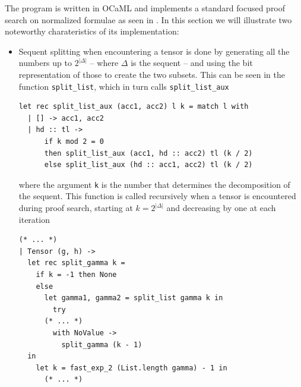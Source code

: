 \documentclass[a4paper, 12pt, tesi, english]{report}
\begin{document}
The program is written in OCaML and implements a standard focused proof search on normalized formulae as seen in \cite{LiangMiller}.
In this section we will illustrate two noteworthy charateristics of its implementation:
\begin{itemize}
	\item Sequent splitting when encountering a tensor is done by generating all the numbers up to $2^{|\Delta|}$ -- where $\Delta$ is the sequent -- and using the bit representation of those to create the two subsets.
		This can be seen in the function \texttt{split\_list}, which in turn calls \texttt{split\_list\_aux}
		\begin{lstlisting}[language=caml]
let rec split_list_aux (acc1, acc2) l k = match l with
  | [] -> acc1, acc2
  | hd :: tl -> 
      if k mod 2 = 0 
      then split_list_aux (acc1, hd :: acc2) tl (k / 2)
      else split_list_aux (hd :: acc1, acc2) tl (k / 2)
		\end{lstlisting}
		where the argument \texttt{k} is the number that determines the decomposition of the sequent.
		This function is called recursively when a tensor is encountered during proof search, starting at $ k = 2^{|\Delta|}$ and decreasing by one at each iteration
		\begin{lstlisting}[language=caml]
(* ... *)
| Tensor (g, h) ->
  let rec split_gamma k = 
    if k = -1 then None
    else
      let gamma1, gamma2 = split_list gamma k in
        try
	  (* ... *)
        with NoValue ->
          split_gamma (k - 1) 
  in
    let k = fast_exp_2 (List.length gamma) - 1 in
      (* ... *)
		\end{lstlisting}


\end{itemize}
\end{document}
